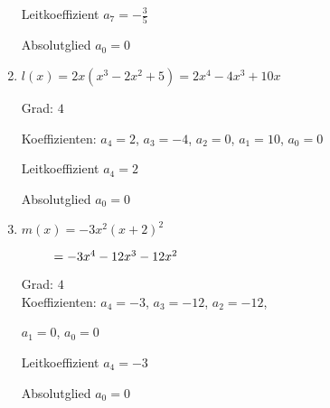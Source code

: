 \begin{Answer}[ref=ganzHauptA1]
\begin{minipage}{\textwidth}
\begin{minipage}[t]{0.5\textwidth}
\begin{enumerate}[label=\alph*)]
				Leitkoeffizient \(a_7=-\frac{3}{5}\)

				Absolutglied \(a_0=0\)
				\item \(l(x)=2x\left(x^3-2x^2+5\right)=2x^4-4x^3+10x\)

				Grad: \(4\)

				Koeffizienten: \(a_4=2\), \(a_3=-4\), \(a_2=0\), \(a_1=10\), \(a_0=0\)

				Leitkoeffizient \(a_4=2\)

				Absolutglied \(a_0=0\)
				\item \(m(x)=-3x^2\left(x+2\right)^2\)

				\(\hphantom{m(x)}=-3x^4-12x^3-12x^2\)

				Grad: \(4\)\\
				Koeffizienten: \(a_4=-3\), \(a_3=-12\), \(a_2=-12\),

				\(a_1=0\), \(a_0=0\)

				Leitkoeffizient \(a_4=-3\)

				Absolutglied \(a_0=0\)
			\end{enumerate}
		\end{minipage}%
	\end{minipage}%
\end{Answer}